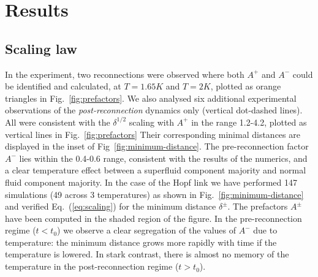 \documentclass[9pt,twocolumn,twoside]{pnas-new}
\def\red#1{\textcolor{red}{#1}}
\begin{document}
\section*{Results}

\subsection*{Scaling law}

In the experiment, two reconnections were observed where both $A^+$ and $A^-$ could be identified and calculated, at $T=1.65K$ and $T=2K$, plotted as orange triangles in Fig.~\ref{fig:prefactors}. We also analysed six additional experimental observations of the \emph{post-reconnection} dynamics only (vertical dot-dashed lines). All were consistent with the $\delta^{1/2}$ scaling with $A^+$ in the range 1.2-4.2, plotted as vertical lines in Fig.~\ref{fig:prefactors} Their corresponding minimal distances are displayed in the inset of Fig~\ref{fig:minimum-distance}.
%
The pre-reconnection factor $A^-$ lies within the 0.4-0.6 range, consistent with the results of the numerics, and a clear temperature effect between a superfluid component majority and normal fluid component majority.
In the case of the Hopf link 
we have performed 147 simulations 
(49 across 3 temperatures) as shown in Fig.~\ref{fig:minimum-distance} and
verified Eq.~(\ref{eq:scaling}) for the minimum distance $\delta^{\pm}$. 
The prefactors $A^{\pm}$ have been computed in the shaded region 
of the figure. In the pre-reconnection regime ($t<t_0$) we observe
a clear segregation of the values of $A^-$ due to temperature: 
the minimum distance grows more rapidly with time if the temperature is
lowered. 
In stark contrast, there is almost no memory of the temperature in the
post-reconnection regime ($t>t_0$). 
\end{document}
